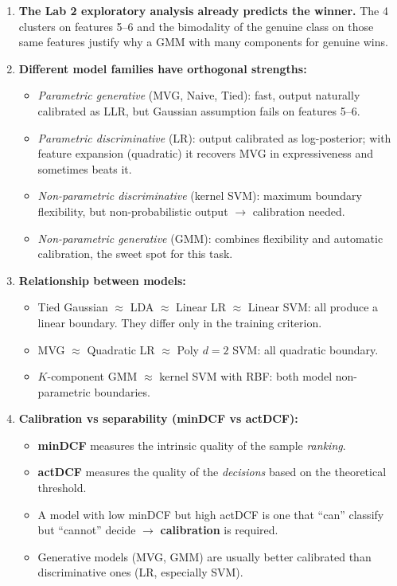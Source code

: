\documentclass[11pt,a4paper]{article}
\begin{document}
\begin{enumerate}
\item \textbf{The Lab 2 exploratory analysis already predicts the
      winner.} The 4 clusters on features 5--6 and the bimodality of
      the genuine class on those same features justify why a GMM with
      many components for genuine wins.

\item \textbf{Different model families have orthogonal strengths:}
      \begin{itemize}
      \item \emph{Parametric generative} (MVG, Naive, Tied): fast,
            output naturally calibrated as LLR, but Gaussian
            assumption fails on features 5--6.
      \item \emph{Parametric discriminative} (LR): output calibrated
            as log-posterior; with feature expansion (quadratic) it
            recovers MVG in expressiveness and sometimes beats it.
      \item \emph{Non-parametric discriminative} (kernel SVM): maximum
            boundary flexibility, but non-probabilistic output
            $\rightarrow$ calibration needed.
      \item \emph{Non-parametric generative} (GMM): combines
            flexibility and automatic calibration, the sweet spot for
            this task.
      \end{itemize}

\item \textbf{Relationship between models:}
      \begin{itemize}
      \item Tied Gaussian $\approx$ LDA $\approx$ Linear LR
            $\approx$ Linear SVM: all produce a linear boundary.
            They differ only in the training criterion.
      \item MVG $\approx$ Quadratic LR $\approx$ Poly $d=2$ SVM:
            all quadratic boundary.
      \item $K$-component GMM $\approx$ kernel SVM with RBF: both
            model non-parametric boundaries.
      \end{itemize}

\item \textbf{Calibration vs separability (minDCF vs actDCF):}
      \begin{itemize}
      \item \textbf{minDCF} measures the intrinsic quality of the
            sample \emph{ranking}.
      \item \textbf{actDCF} measures the quality of the
            \emph{decisions} based on the theoretical threshold.
      \item A model with low minDCF but high actDCF is one that ``can''
            classify but ``cannot'' decide $\rightarrow$
            \textbf{calibration} is required.
      \item Generative models (MVG, GMM) are usually better calibrated
            than discriminative ones (LR, especially SVM).
      \end{itemize}


\end{enumerate}
\end{document}
